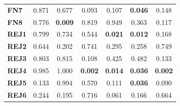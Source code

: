 \begin{table}
\begin{tabular}{lccc|ccc}
        \textbf{FN7}  & 0.871                                   & 0.677                                             & 0.093                                  & 0.107                                    & \cellcolor[HTML]{EFEFEF}\textbf{0.046} & 0.148                                  \\
        \textbf{FN8}  & 0.776                                   & \cellcolor[HTML]{EFEFEF}\textbf{0.009}            & 0.819                                  & 0.949                                    & 0.363                                  & 0.117                                  \\
        \textbf{REJ1} & 0.799                                   & 0.734                                             & 0.544                                  & \cellcolor[HTML]{EFEFEF}\textbf{0.021}   & \cellcolor[HTML]{EFEFEF}\textbf{0.012} & 0.168                                  \\
        \textbf{REJ2} & 0.644                                   & 0.202                                             & 0.741                                  & 0.295                                    & 0.258                                  & 0.749                                  \\
        \textbf{REJ3} & 0.803                                   & 0.815                                             & 0.108                                  & 0.425                                    & 0.482                                  & 0.133                                  \\
        \textbf{REJ4} & 0.985                                   & 1.000                                             & \cellcolor[HTML]{EFEFEF}\textbf{0.002} & \cellcolor[HTML]{EFEFEF}\textbf{0.014}   & \cellcolor[HTML]{EFEFEF}\textbf{0.036} & \cellcolor[HTML]{EFEFEF}\textbf{0.002} \\
        \textbf{REJ5} & 0.133                                   & 0.994                                             & 0.570                                  & 0.111                                    & \cellcolor[HTML]{EFEFEF}\textbf{0.036} & 0.090                                  \\
        \textbf{REJ6} & 0.244                                   & 0.195                                             & 0.716                                  & 0.061                                    & 0.166                                  & 0.664                                  \\

\end{tabular}
\end{table}
